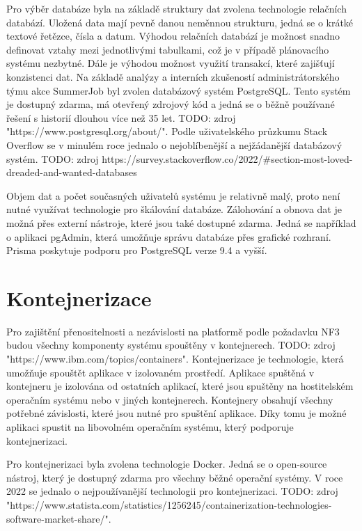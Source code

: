 Pro výběr databáze byla na základě struktury dat zvolena technologie relačních databází. Uložená data mají pevně danou neměnnou strukturu,
jedná se o krátké textové řetězce, čísla a datum. Výhodou relačních databází je možnost snadno definovat vztahy mezi jednotlivými tabulkami,
což je v případě plánovacího systému nezbytné. Dále je výhodou možnost využití transakcí, které zajišťují konzistenci dat.
Na základě analýzy a interních zkušeností administrátorského týmu akce SummerJob byl zvolen databázový systém PostgreSQL. Tento systém je
dostupný zdarma, má otevřený zdrojový kód a jedná se o běžně používané řešení s historií dlouhou více než 35 let. TODO: zdroj "https://www.postgresql.org/about/".
Podle uživatelského průzkumu Stack Overflow se v minulém roce jednalo o nejoblíbenější a nejžádanější databázový systém. TODO: zdroj  https://survey.stackoverflow.co/2022/\#section-most-loved-dreaded-and-wanted-databases

Objem dat a počet současných uživatelů systému je relativně malý, proto není nutné využívat technologie pro škálování databáze. Zálohování a obnova dat
je možná přes externí nástroje, které jsou také dostupné zdarma. Jedná se například o aplikaci pgAdmin, která umožňuje správu databáze přes grafické rozhraní.
Prisma poskytuje podporu pro PostgreSQL verze 9.4 a vyšší.

\section{Kontejnerizace}

Pro zajištění přenositelnosti a nezávislosti na platformě podle požadavku NF3 budou všechny komponenty systému spouštěny v kontejnerech. TODO: zdroj "https://www.ibm.com/topics/containers".
Kontejnerizace je technologie, která umožňuje spouštět aplikace v izolovaném prostředí. Aplikace spuštěná v kontejneru je izolována od ostatních aplikací,
které jsou spuštěny na hostitelském operačním systému nebo v jiných kontejnerech. Kontejnery obsahují
všechny potřebné závislosti, které jsou nutné pro spuštění aplikace. Díky tomu je možné aplikaci spustit na libovolném operačním systému, který podporuje kontejnerizaci.

Pro kontejnerizaci byla zvolena technologie Docker. Jedná se o open-source nástroj, který je dostupný zdarma pro všechny běžné operační systémy.
V roce 2022 se jednalo o nejpoužívanější technologii pro kontejnerizaci. TODO: zdroj "https://www.statista.com/statistics/1256245/containerization-technologies-software-market-share/".

